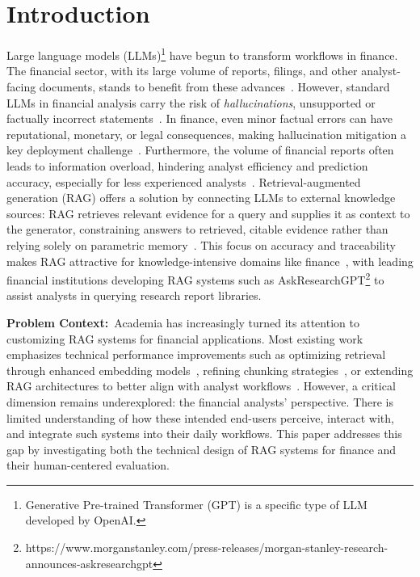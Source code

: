 \documentclass[final,5p,times,twopage,twocolumn,a4paper]{elsarticle}
\begin{document}
\section{Introduction}
\label{chap:introduction}
Large language models (LLMs)\footnote{Generative Pre-trained Transformer (GPT) is a specific type of LLM developed by OpenAI.} have begun to transform workflows in finance. The financial sector, with its large volume of reports, filings, and other analyst-facing documents, stands to benefit from these advances~\cite{nie2024survey}. However, standard LLMs in financial analysis carry the risk of \textit{hallucinations}, unsupported or factually incorrect statements~\cite{ray_srinivasan_2024amazon,sarmah2023towards}. In finance, even minor factual errors can have reputational, monetary, or legal consequences, making hallucination mitigation a key deployment challenge~\cite{nie2024survey}. Furthermore, the volume of financial reports often leads to information overload, hindering analyst efficiency and prediction accuracy, especially for less experienced analysts~\cite{impink2022regulation}. Retrieval-augmented generation (RAG) offers a solution by connecting LLMs to external knowledge sources: RAG retrieves relevant evidence for a query and supplies it as context to the generator, constraining answers to retrieved, citable evidence rather than relying solely on parametric memory~\cite{lewis2020retrieval,gao2023retrieval}. This focus on accuracy and traceability makes RAG attractive for knowledge-intensive domains like finance~\cite{sarmah2023towards}, with leading financial institutions developing RAG systems such as AskResearchGPT\footnote{https://www.morganstanley.com/press-releases/morgan-stanley-research-announces-askresearchgpt} to assist analysts in querying research report libraries.

\textbf{Problem Context:}~Academia has increasingly turned its attention to customizing RAG systems for financial applications. Most existing work emphasizes technical performance improvements such as optimizing retrieval through enhanced embedding models~\cite{iaroshev2024evaluating}, refining chunking strategies~\cite{yepes2024financial}, or extending RAG architectures to better align with analyst workflows~\cite{zhou2024finrobot}. However, a critical dimension remains underexplored: the financial analysts' perspective. There is limited understanding of how these intended end-users perceive, interact with, and integrate such systems into their daily workflows. This paper addresses this gap by investigating both the technical design of RAG systems for finance and their human-centered evaluation.
\end{document}
